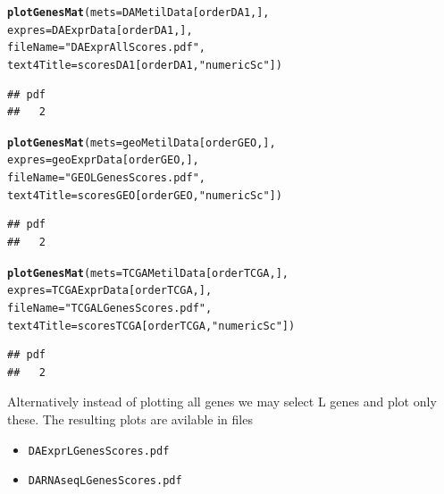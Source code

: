 \documentclass[a4paper,10pt]{article}\usepackage[]{graphicx}\usepackage[]{color}
\makeatletter
\newcommand{\hlstr}[1]{\textcolor[rgb]{0.192,0.494,0.8}{#1}}%
\newcommand{\hlstd}[1]{\textcolor[rgb]{0.345,0.345,0.345}{#1}}%
\newcommand{\hlkwc}[1]{\textcolor[rgb]{0.333,0.667,0.333}{#1}}%
\newcommand{\hlkwd}[1]{\textcolor[rgb]{0.737,0.353,0.396}{\textbf{#1}}}%
\newenvironment{kframe}{%
 \def\at@end@of@kframe{}%
 \ifinner\ifhmode%
  \def\at@end@of@kframe{\end{minipage}}%
  \begin{minipage}{\columnwidth}%
 \fi\fi%
 \def\FrameCommand##1{\hskip\@totalleftmargin \hskip-\fboxsep
 \colorbox{shadecolor}{##1}\hskip-\fboxsep
     \hskip-\linewidth \hskip-\@totalleftmargin \hskip\columnwidth}%
 \MakeFramed {\advance\hsize-\width
   \@totalleftmargin\z@ \linewidth\hsize
   \@setminipage}}%
 {\par\unskip\endMakeFramed%
 \at@end@of@kframe}
\newenvironment{knitrout}{}{} %
\makeatother
\begin{document}
\begin{knitrout}
\color{fgcolor}\begin{kframe}
\begin{alltt}
\hlkwd{plotGenesMat} \hlstd{(}\hlkwc{mets}\hlstd{=DAMetilData[orderDA1,],}
              \hlkwc{expres}\hlstd{=DAExprData[orderDA1,],}
              \hlkwc{fileName} \hlstd{=}\hlstr{"DAExprAllScores.pdf"}\hlstd{,}
              \hlkwc{text4Title} \hlstd{= scoresDA1[orderDA1,}\hlstr{"numericSc"}\hlstd{])}
\end{alltt}
\begin{verbatim}
## pdf 
##   2
\end{verbatim}
\begin{alltt}
\hlkwd{plotGenesMat} \hlstd{(}\hlkwc{mets}\hlstd{=geoMetilData[orderGEO,],}
              \hlkwc{expres}\hlstd{=geoExprData[orderGEO,],}
              \hlkwc{fileName} \hlstd{=}\hlstr{"GEOLGenesScores.pdf"}\hlstd{,}
              \hlkwc{text4Title} \hlstd{= scoresGEO[orderGEO,}\hlstr{"numericSc"}\hlstd{])}
\end{alltt}
\begin{verbatim}
## pdf 
##   2
\end{verbatim}
\begin{alltt}
\hlkwd{plotGenesMat} \hlstd{(}\hlkwc{mets}\hlstd{=TCGAMetilData[orderTCGA,],}
              \hlkwc{expres}\hlstd{=TCGAExprData[orderTCGA,],}
              \hlkwc{fileName} \hlstd{=}\hlstr{"TCGALGenesScores.pdf"}\hlstd{,}
              \hlkwc{text4Title} \hlstd{= scoresTCGA[orderTCGA,}\hlstr{"numericSc"}\hlstd{])}
\end{alltt}
\begin{verbatim}
## pdf 
##   2
\end{verbatim}
\end{kframe}
\end{knitrout}

Alternatively instead of plotting all genes we may select L genes and plot only these.
The resulting plots are avilable in files 
\begin{itemize}
  \item \texttt{DAExprLGenesScores.pdf}
  \item \texttt{DARNAseqLGenesScores.pdf}
\end{itemize}
\end{document}
